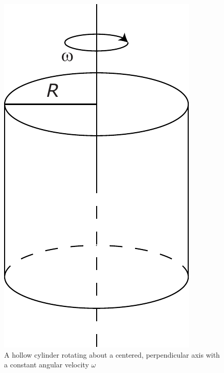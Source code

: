 \begin{figure}[H]
  \centering
  \includegraphics[width=0.25\linewidth]{fig/images/rotating_hollow_cylinder.pdf}
  \caption{A hollow cylinder rotating about a centered, perpendicular axis with a constant angular velocity $\omega$}
  \label{fig:rotating_hollow_cylinder}
\end{figure}